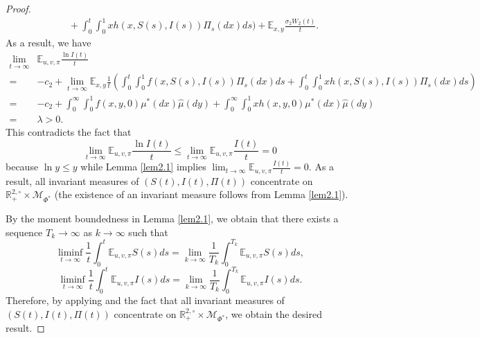 \documentclass[12pt]{amsart}
\theoremstyle{remark}
\numberwithin{equation}{section}
\newcommand{\M}{\mathcal{M}}
\newcommand{\E}{\mathbb{E}}
\newcommand{\K}{\mathcal{K}}
\newcommand{\R}{\mathbb{R}}
\numberwithin{equation}{section}
\newcommand{\Ei}{\E_{u,v,\pi}}
\newcommand{\1}{\boldsymbol{1}}
\def\hat{\widehat}
\begin{document}
\begin{proof}
$$\begin{aligned}
	&\qquad+\int_0^t\int_0^1xh(x,S(s),I(s))\Pi_s(dx)ds\bigg)
	+ \E_{x,y} \frac{\sigma_2W_2(t)}t.
	\end{aligned}
	$$
	As a result,
	we have
	$$
	\begin{aligned}
	\lim_{t\to\infty}&\Ei\frac{\ln I(t)}t\\
	=&
	-c_2+\lim_{t\to\infty}\E_{x,y }\frac1t\left(\int_0^t\int_0^1 f(x,S(s),I(s))\Pi_s(dx)ds+\int_0^t\int_0^1xh(x,S(s),I(s))\Pi_s(dx)ds\right)\\
	=&-c_2+\int_0^\infty \int_0^1f(x,y,0)\mu^*(dx)\hat\mu(dy)+\int_0^\infty\int_0^1 xh(x,y,0)\mu^*(dx)\hat\mu(dy)\\
	=&\lambda>0.
	\end{aligned}
	$$
	This contradicts the fact that
	$$\lim_{t\to\infty}\Ei\frac{\ln I(t)}t\leq \lim_{t\to\infty}\Ei\frac{ I(t)}t=0$$
	because $\ln y\leq y$ while Lemma \ref{lem2.1} implies $\lim_{t\to\infty}\Ei\frac{ I(t)}t=0$.
	As a result, all invariant measures of $(S(t),I(t),\Pi(t))$ concentrate on $\R^{2,\circ}_+\times\M_{\Phi^*}$ (the existence of an invariant measure follows from Lemma \ref{lem2.1}).
	
	By the moment boundedness in Lemma \ref{lem2.1}, we obtain that there exists a sequence $T_k\to\infty$ as $k\to\infty$ such that
	$$
	\liminf_{t\to\infty}\frac 1t\int_0^t\E_{u,v,\pi}S(s)ds=\lim_{k\to\infty}\frac1{T_k}\int_0^{T_k}\E_{u,v,\pi}S(s)ds,
	$$
	$$\liminf_{t\to\infty}\frac 1t\int_0^t\E_{u,v,\pi}I(s)ds=\lim_{k\to\infty}\frac1{T_k}\int_0^{T_k}\E_{u,v,\pi}I(s)ds.
	$$
	Therefore, by applying \cite[Lemma 3.4]{HN18} and the fact that all invariant measures of $(S(t),I(t),\Pi(t))$ concentrate on $\R^{2,\circ}_+\times\M_{\Phi^*}$, we obtain the desired result.
\end{proof}
\end{document}
